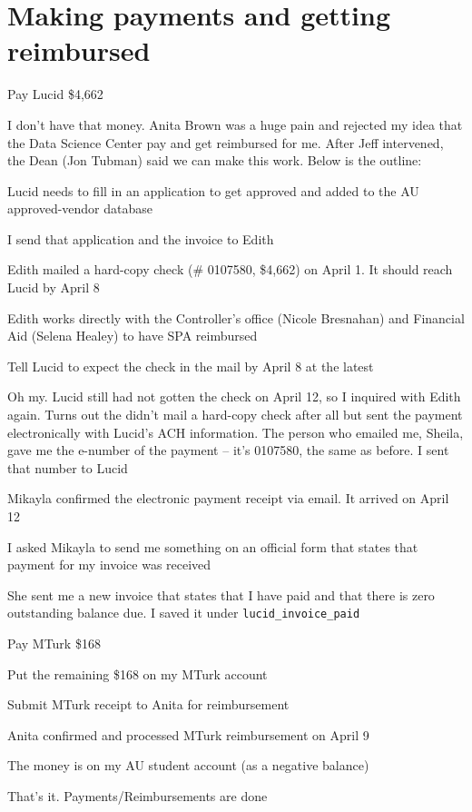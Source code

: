 \section*{Making payments and getting reimbursed}
	\begin{coi}
		\item Pay Lucid \$4,662
			\begin{coi}
				\item I don't have that money. Anita Brown was a huge pain and rejected my idea that the Data Science Center pay and get reimbursed for me. After Jeff intervened, the Dean (Jon Tubman) said we can make this work. Below is the outline:
					\begin{coi}
						\item Lucid needs to fill in an application to get approved and added to the AU approved-vendor database
						\item I send that application and the invoice to Edith
						\item Edith mailed a hard-copy check (\# 0107580, \$4,662) on April 1. It should reach Lucid by April 8
						\item Edith works directly with the Controller's office (Nicole Bresnahan) and Financial Aid (Selena Healey) to have SPA reimbursed
						\item Tell Lucid to expect the check in the mail by April 8 at the latest
						\item Oh my. Lucid still had not gotten the check on April 12, so I inquired with Edith again. Turns out the didn't mail a hard-copy check after all but sent the payment electronically with Lucid's ACH information. The person who emailed me, Sheila, gave me the e-number of the payment -- it's 0107580, the same as before. I sent that number to Lucid
						\item Mikayla confirmed the electronic payment receipt via email. It arrived on April 12
						\item I asked Mikayla to send me something on an official form that states that payment for my invoice was received
						\item She sent me a new invoice that states that I have paid and that there is zero outstanding balance due. I saved it under \texttt{lucid\_invoice\_paid}
					\end{coi}
			\end{coi}
		\item Pay MTurk \$168
			\begin{coi}
				\item Put the remaining \$168 on my MTurk account
				\item Submit MTurk receipt to Anita for reimbursement
				\item Anita confirmed and processed MTurk reimbursement on April 9
				\item The money is on my AU student account (as a negative balance)
			\end{coi}
		\item That's it. Payments/Reimbursements are done
	\end{coi}






